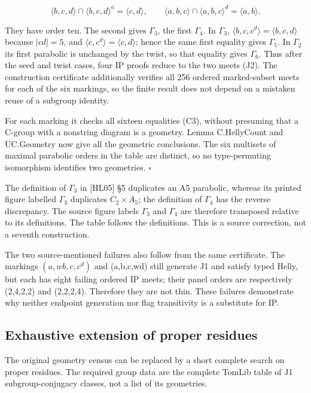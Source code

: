\[
\langle b,c,d\rangle\cap\langle b,c,d\rangle^a=\langle c,d\rangle,
\qquad
\langle a,b,c\rangle\cap\langle a,b,c\rangle^d=\langle a,b\rangle.
\tag{J2}
\]

They have order ten. The second gives \(\Gamma_3\), the first
\(\Gamma_4\). In \(\Gamma_3\),
\(\langle b,c,c^d\rangle =\langle b,c,d\rangle\) because \(|cd|=5\), and
\(\langle c,c^d\rangle =\langle c,d\rangle\); hence the same first
equality gives \(\Gamma_5\). In \(\Gamma_2\) its first parabolic is
unchanged by the twist, so that equality gives \(\Gamma_6\). Thus after
the seed and twist cases, four IP proofs reduce to the two meets (J2).
The construction certificate additionally verifies all 256 ordered
marked-subset meets for each of the six markings, so the finite result
does not depend on a mistaken reuse of a subgroup identity.

For each marking it checks all sixteen equalities (C3), without
presuming that a C-group with a nonstring diagram is a geometry. Lemma
C.HellyCount and UC.Geometry now give all the geometric conclusions. The
six multisets of maximal parabolic orders in the table are distinct, so
no type-permuting isomorphism identifies two geometries. \(\square\)

The definition of \(\Gamma_3\) in {[}HL05{]} §5 duplicates an A5
parabolic, whereas its printed figure labelled \(\Gamma_3\) duplicates
\(C_{2}\times A_{5}\); the definition of \(\Gamma_4\) has the reverse
discrepancy. The source figure labels \(\Gamma_3\) and \(\Gamma_4\) are
therefore transposed relative to its definitions. The table follows the
definitions. This is a source correction, not a seventh construction.

The two source-mentioned failures also follow from the same certificate.
The markings \((a,wb,c,c^d)\) and (a,b,c,wd) still generate J1 and
satisfy typed Helly, but each has eight failing ordered IP meets; their
panel orders are respectively (2,4,2,2) and (2,2,2,4). Therefore they
are not thin. These failures demonstrate why neither endpoint generation
nor flag transitivity is a substitute for IP.

\subsection{Exhaustive extension of proper
residues}\label{exhaustive-extension-of-proper-residues}

The original geometry census can be replaced by a short complete search
on proper residues. The required group data are the complete TomLib
table of J1 subgroup-conjugacy classes, not a list of its geometries.

